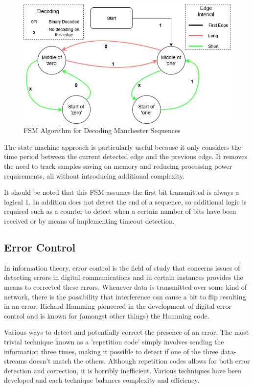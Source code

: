 \begin{figure}[H]
	\centering
	\includegraphics[width=0.7\linewidth]{figures/litreview/manchester_decoding_fsm.png}
	\caption{FSM Algorithm for Decoding Manchester Sequences}
	\label{fig:manchesterdecodingfsm}
\end{figure}

The state machine approach is particularly useful because it only considers the time period between the current detected edge and the previous edge. It removes the need to track samples saving on memory and reducing processing power requirements, all without introducing additional complexity.

It should be noted that this FSM assumes the first bit transmitted is always a logical 1. In addition does not detect the end of a sequence, so additional logic is required such as a counter to detect when a certain number of bits have been received or by means of implementing timeout detection.

\subsection{Error Control}

In information theory, error control is the field of study that concerns issues of detecting errors in digital communications and in certain instances provides the means to corrected these errors. Whenever data is transmitted over some kind of network, there is the possibility that interference can cause a bit to flip resulting in an error. Richard Hamming pioneered in the development of digital error control and is known for (amongst other things) the Hamming code.

Various ways to detect and potentially correct the presence of an error. The most trivial technique known as a 'repetition code' simply involves sending the information three times, making it possible to detect if one of the three data-streams doesn't match the others. Although repetition codes allows for both error detection and correction, it is horribly inefficient. Various techniques have been developed and each technique balances complexity and efficiency.

